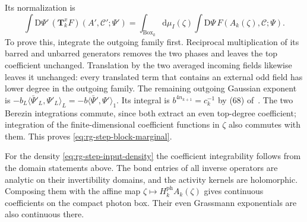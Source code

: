 \documentclass[11pt,letterpaper,reqno]{amsart}
\newcommand{\dd}{\mathrm d}
\newcommand{\exteq}[2]{(#1) of~\cite{#2}}
\begin{document}
Its normalization is
\begin{equation}\label{eq:rg-step-block-marginal}
 \int\mathrm D\Psi'\,(\mathbf T_k^xF)(A',\mathscr C';\Psi')
       =\int_{\mathrm{Box}_k}\dd\mu_I(\zeta)
                       \int\mathrm D\Psi\,F(A_k(\zeta),\mathscr C;\Psi).
\end{equation}
To prove this, integrate the outgoing family first.
Reciprocal multiplication of its barred and unbarred
generators removes the two phases and leaves the top
coefficient unchanged. Translation by the two averaged
incoming fields likewise leaves it unchanged: every
translated term that contains an external odd field
has lower degree in the outgoing family.
The remaining outgoing Gaussian exponent is
$-b_L\langle\bar\Psi'_L,\Psi'_L\rangle_L
=-b\langle\bar\Psi',\Psi'\rangle_1$.
Its integral is $b^{4n_{k+1}}=c_k^{-1}$ by
\exteq{68}{FermionBlockManuscript}.
The two Berezin integrations commute, since both
extract an even top-degree coefficient; integration
of the finite-dimensional coefficient functions in
$\zeta$ also commutes with them. This proves
\eqref{eq:rg-step-block-marginal}.

For the density \eqref{eq:rg-step-input-density}
the coefficient integrability follows from the domain
statements above. The bond entries of all inverse
operators are analytic on their invertibility domains,
and the activity kernels are holomorphic. Composing
them with the affine map $\zeta\mapsto
H_k^{\mathrm{ph}}A_k(\zeta)$ gives continuous
coefficients on the compact photon box. Their even
Grassmann exponentials are also continuous there.
\end{document}
